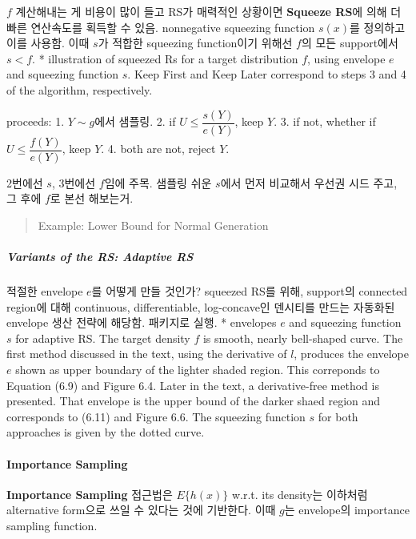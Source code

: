 \documentclass[
]{book}
\begin{document}
\(f\) 계산해내는 게 비용이 많이 들고 RS가 매력적인 상황이면 \textbf{Squeeze RS}에 의해 더 빠른 연산속도를 획득할 수 있음. nonnegative squeezing function \(s(x)\)를 정의하고 이를 사용함. 이때 \(s\)가 적합한 squeezing function이기 위해선 \(f\)의 모든 support에서 \(s<f\).
* illustration of squeezed Rs for a target distribution \(f\), using envelope \(e\) and squeezing function \(s\). Keep First and Keep Later correspond to steps 3 and 4 of the algorithm, respectively.

proceeds:
1. \(Y \sim g\)에서 샘플링.
2. if \(U \le \dfrac {s(Y)}{e(Y)}\), keep \(Y\).
3. if not, whether if \(U \le \dfrac {f(Y)}{e(Y)}\), keep \(Y\).
4. both are not, reject \(Y\).

2번에선 \(s\), 3번에선 \(f\)임에 주목. 샘플링 쉬운 \(s\)에서 먼저 비교해서 우선권 시드 주고, 그 후에 \(f\)로 본선 해보는거.

\begin{quote}
Example: Lower Bound for Normal Generation
\end{quote}

\hypertarget{variants-of-the-rs-adaptive-rs}{%
\subparagraph{Variants of the RS: Adaptive RS}\label{variants-of-the-rs-adaptive-rs}}

적절한 envelope \(e\)를 어떻게 만들 것인가? squeezed RS를 위해, support의 connected region에 대해 continuous, differentiable, log-concave인 덴시티를 만드는 자동화된 envelope 생산 전략에 해당함. 패키지로 실행.
* envelopes \(e\) and squeezing function \(s\) for adaptive RS. The target density \(f\) is smooth, nearly bell-shaped curve. The first method discussed in the text, using the derivative of \(l\), produces the envelope \(e\) shown as upper boundary of the lighter shaded region. This correponds to Equation (6.9) and Figure 6.4. Later in the text, a derivative-free method is presented. That envelope is the upper bound of the darker shaed region and corresponds to (6.11) and Figure 6.6. The squeezing function \(s\) for both approaches is given by the dotted curve.

\hypertarget{importance-sampling-1}{%
\paragraph{Importance Sampling}\label{importance-sampling-1}}

\textbf{Importance Sampling} 접근법은 \(E\{h(x)\}\) w.r.t. its density는 이하처럼 alternative form으로 쓰일 수 있다는 것에 기반한다. 이때 \(g\)는 envelope의 importance sampling function.
\end{document}
